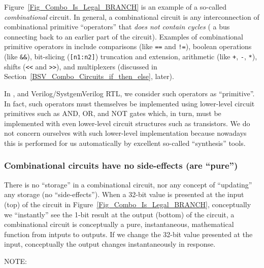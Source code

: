 Figure~\ref{Fig_Combo_Is_Legal_BRANCH} is an example of a so-called
\emph{combinational} circuit.  In general, a combinational circuit is
any interconnection of combinational primitive ``operators'' that
\emph{does not contain cycles} ({\ie} a bus connecting back to an
earlier part of the circuit).  Examples of combinational primitive
operators in {\BSV} include comparisons (like \verb|==| and \verb|!=|),
boolean operations (like \verb|&&|), bit-slicing (\verb|[n1:n2]|)
truncation and extension, arithmetic (like \verb|+|, \verb|-|,
\verb|*|), shifts (\verb|<<| and \verb|>>|), and multiplexers
(discussed in Section~\ref{BSV_Combo_Circuits_if_then_else}, later).

In {\BSV}, and Verilog/SystgemVerilog RTL, we consider such operators as
``primitive''.  In fact, such operators must themselves be implemented
using lower-level circuit primitives such as AND, OR, and NOT gates
which, in turn, must be implemented with even lower-level circuit
structures such as transistors.  We do not concern ourselves with such
lower-level implementation because nowadays this is performed for us
automatically by excellent so-called ``synthesis'' tools.


\subsubsection{Combinational circuits have no side-effects (are ``pure'')}


There is no ``storage'' in a combinational circuit, nor any concept of
``updating'' any storage (no ``side-effects'').  When a 32-bit value
is presented at the input (top) of the circuit in
Figure~\ref{Fig_Combo_Is_Legal_BRANCH}, conceptually we
``instantly'' see the 1-bit result at the output (bottom) of the
circuit, {\ie} a combinational circuit is conceptually a pure,
instantaneous, mathematical function from intputs to outputs.  If we
change the 32-bit value presented at the input, conceptually the
output changes instantaneously in response.



NOTE: 

